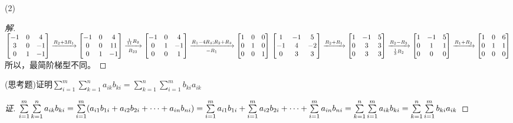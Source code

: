 \documentclass[10pt,a4paper]{report}
\begin{document}
\noindent (2)
\begin{proof}[解]
	$
	\left[
	\begin{matrix}
	-1 & 0 & 4\\
	3 & 0 & -1\\
	0 & 1 & -1
	\end{matrix}
	\right] \xrightarrow{R_{2} + 3R_{1}} \left[
	\begin{matrix}
	-1 & 0 & 4\\
	0 & 0 & 11\\
	0 & 1 & -1
	\end{matrix}
	\right] \xrightarrow[R_{23}]{\frac{1}{11}R_{2}} \left[
	\begin{matrix}
	-1 & 0 & 4\\
	0 & 1 & -1\\
	0 & 0 & 1
	\end{matrix}
	\right] \xrightarrow[-R_{1}]{R_{1}-4R_{3}; R_{2}+R_{3}} \left[
	\begin{matrix}
	1 & 0 & 0\\
	0 & 1 & 0\\
	0 & 0 & 1
	\end{matrix}
	\right]\\
	\left[
	\begin{matrix}
	1 & -1 & 5\\
	-1 & 4 & -2\\
	0 & 3 & 3
	\end{matrix}
	\right] \xrightarrow{R_{2}+R_{1}} \left[
	\begin{matrix}
	1 & -1 & 5\\
	0 & 3 & 3\\
	0 & 3 & 3
	\end{matrix}
	\right]
	\xrightarrow[\frac{1}{3}R_{2}]{R_{2}-R_{3}} \left[
	\begin{matrix}
	1 & -1 & 5\\
	0 & 1 & 1\\
	0 & 0 & 0
	\end{matrix}
	\right] \xrightarrow{R_{1}+R_{2}} \left[
	\begin{matrix}
	1 & 0 & 6\\
	0 & 1 & 1\\
	0 & 0 & 0
	\end{matrix}
	\right]
	$
	所以，最简阶梯型不同。
\end{proof}
\noindent (思考题)证明$\sum\limits_{i=1}^{m}\sum\limits_{k=1}^{n}a_{ik}b_{ki} = \sum\limits_{k=1}^{n}\sum\limits_{i=1}^{m}b_{ki}a_{ik}$\\
\begin{proof}[证]
	$\sum\limits_{i=1}^{m}\sum\limits_{k=1}^{n}a_{ik}b_{ki} = \sum\limits_{i=1}^{m}(a_{i1}b_{1i} + a_{i2}b_{2i}+ \cdots + a_{in}b_{ni})\\
	= \sum\limits_{i=1}^{m}a_{i1}b_{1i} + \sum\limits_{i=1}^{m}a_{i2}b_{2i}+ \cdots + \sum\limits_{i=1}^{m}a_{in}b_{ni} = \sum\limits_{k=1}^{n}\sum\limits_{i=1}^{m}a_{ik}b_{ki} = \sum\limits_{k=1}^{n}\sum\limits_{i=1}^{m}b_{ki}a_{ik}$
\end{proof}
\end{document}
